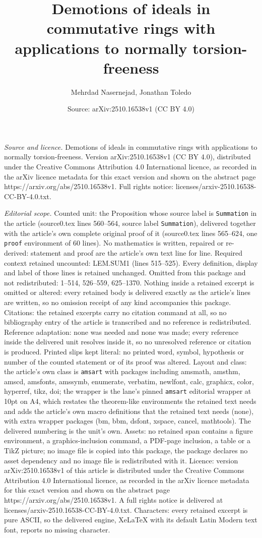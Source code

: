 \documentclass[10pt,a4paper]{amsart}
\title[Demotions of ideals in commutative rings with applications t]{Demotions of ideals in commutative rings with applications to normally torsion-freeness}
\author{Mehrdad Nasernejad, Jonathan Toledo}
\date{Source: arXiv:2510.16538v1 (CC BY 4.0)}
\begin{document}
\maketitle

\noindent\emph{Source and licence.} Demotions of ideals in commutative rings with applications to normally torsion-freeness. Version arXiv:2510.16538v1 (CC BY 4.0), distributed under the Creative Commons Attribution 4.0 International licence, as recorded in the arXiv licence metadata for this exact version and shown on the abstract page https://arxiv.org/abs/2510.16538v1. Full rights notice: licenses/arxiv-2510.16538-CC-BY-4.0.txt.\par\smallskip

\noindent\textit{Editorial scope.} Counted unit: the Proposition whose source label is \texttt{Summation} in the article (source0.tex lines 560--564, source label \texttt{Summation}), delivered together with the article's own complete original proof of it (source0.tex lines 565--624, one \texttt{proof} environment of 60 lines). No mathematics is written, repaired or re-derived: statement and proof are the article's own text line for line. Required context retained uncounted: LEM.SUM1 (lines 515--525). Every definition, display and label of those lines is retained unchanged. Omitted from this package and not redistributed: 1--514, 526--559, 625--1370. Nothing inside a retained excerpt is omitted or altered: every retained body is delivered exactly as the article's lines are written, so no omission receipt of any kind accompanies this package. Citations: the retained excerpts carry no citation command at all, so no bibliography entry of the article is transcribed and no reference is redistributed. Reference adaptation: none was needed and none was made; every reference inside the delivered unit resolves inside it, so no unresolved reference or citation is produced. Printed slips kept literal: no printed word, symbol, hypothesis or number of the counted statement or of its proof was altered. Layout and class: the article's own class is \texttt{amsart} with packages including amsmath, amsthm, amscd, amsfonts, amssymb, enumerate, verbatim, newlfont, calc, graphicx, color, hyperref, tikz, doi; the wrapper is the lane's pinned \texttt{amsart} editorial wrapper at 10pt on A4, which restates the theorem-like environments the retained text needs and adds the article's own macro definitions that the retained text needs (none), with extra wrapper packages (bm, bbm, dsfont, xspace, cancel, mathtools). The delivered numbering is the unit's own. Assets: no retained span contains a figure environment, a graphics-inclusion command, a PDF-page inclusion, a table or a TikZ picture; no image file is copied into this package, the package declares no asset dependency and no image file is redistributed with it. Licence: version arXiv:2510.16538v1 of this article is distributed under the Creative Commons Attribution 4.0 International licence, as recorded in the arXiv licence metadata for this exact version and shown on the abstract page https://arxiv.org/abs/2510.16538v1. A full rights notice is delivered at licenses/arxiv-2510.16538-CC-BY-4.0.txt. Characters: every retained excerpt is pure ASCII, so the delivered engine, XeLaTeX with its default Latin Modern text font, reports no missing character.
\end{document}
